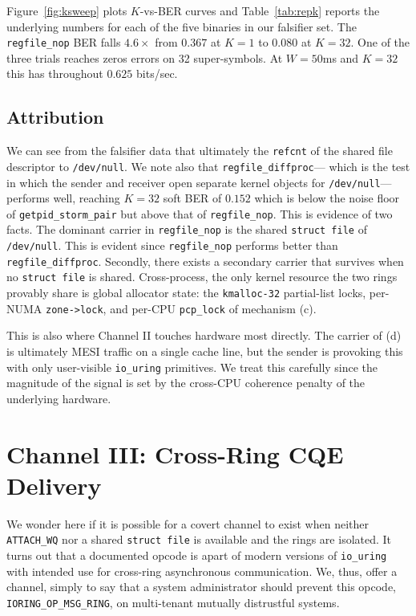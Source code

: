 \documentclass[letterpaper,twocolumn,10pt]{article}
\newcommand{\code}[1]{\texttt{#1}}
\newcommand{\iouring}{\texttt{io\_uring}\xspace}
\begin{document}
Figure~\ref{fig:ksweep} plots $K$-vs-BER curves and Table~\ref{tab:repk} reports the underlying numbers for each of the five binaries in our falsifier set. The \code{regfile\_nop} BER falls $4.6\times$ from $0.367$ at $K = 1$ to $0.080$ at $K=32$. One of the three trials reaches zeros errors on 32 super-symbols. At $W = 50$ms and $K=32$ this has throughout $0.625$ bits/sec.

\subsection{Attribution}
\label{sec:ch2attribution}
We can see from the falsifier data that ultimately the \code{refcnt} of the shared file descriptor to \code{/dev/null}. We note also that \code{regfile\_diffproc}--- which is the test in which the sender and receiver open separate kernel objects for \code{/dev/null}--- performs well, reaching $K=32$ soft BER of $0.152$ which is below the noise floor of \code{getpid\_storm\_pair} but above that of \code{regfile\_nop}. This is evidence of two facts. The dominant carrier in \code{regfile\_nop} is the shared \code{struct file} of \code{/dev/null}. This is evident since \code{regfile\_nop} performs better than \code{regfile\_diffproc}. Secondly, there exists a secondary carrier that survives when no \code{struct file} is shared. Cross-process, the only kernel resource the two rings provably share is global allocator state: the \code{kmalloc-32} partial-list locks, per-NUMA \code{zone->lock}, and per-CPU \code{pcp\_lock} of mechanism (c).

This is also where Channel II touches hardware most directly. The carrier of (d) is ultimately MESI traffic on a single cache line, but the sender is provoking this with only user-visible \iouring primitives. We treat this carefully since the magnitude of the signal is set by the cross-CPU coherence penalty of the underlying hardware.

\section{Channel III: Cross-Ring CQE Delivery}
We wonder here if it is possible for a covert channel to exist when neither \code{ATTACH\_WQ} nor a shared \code{struct file} is available and the rings are isolated. It turns out that a documented opcode is apart of modern versions of \iouring with intended use for cross-ring asynchronous communication. We, thus, offer a channel, simply to say that a system administrator should prevent this opcode, \code{IORING\_OP\_MSG\_RING}, on multi-tenant mutually distrustful systems.
\end{document}

